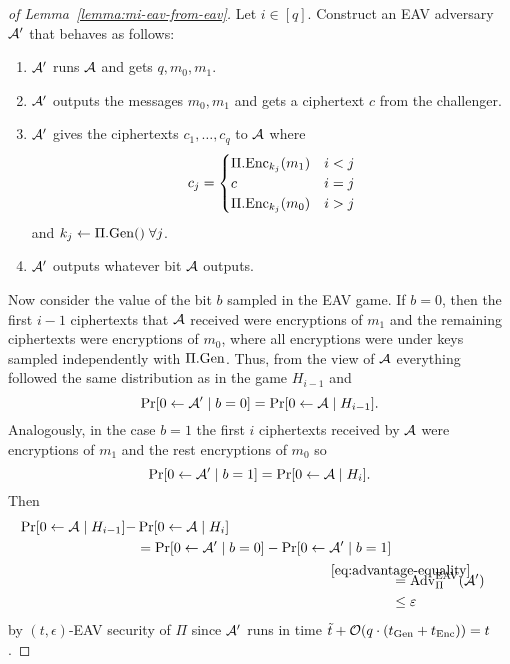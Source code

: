 \begin{proof}[of Lemma~\ref{lemma:mi-eav-from-eav}]
	Let $i \in [q]$. Construct an EAV adversary $\mathcal{A}'$ that behaves as follows:
	\begin{enumerate}[1.]
		\item $\mathcal{A}'$ runs $\mathcal{A}$ and gets $q, m_0, m_1$.
		\item $\mathcal{A}'$ outputs the messages $m_0, m_1$ and gets a ciphertext $c$ from the challenger.
		\item $\mathcal{A}'$ gives the ciphertexts $c_1, \ldots, c_q$ to $\mathcal{A}$ where
		      \[
			      c_j = \begin{cases}
				      \Pi.\mathrm{Enc}_{k_j}(m_1) & i < j \\
				      c                   & i = j \\
				      \Pi.\mathrm{Enc}_{k_j}(m_0) & i > j
			      \end{cases}
		      \]
		      and $k_j \leftarrow \Pi.\mathrm{Gen}() \; \forall j$.
		\item $\mathcal{A}'$ outputs whatever bit $\mathcal{A}$ outputs.
	\end{enumerate}
	Now consider the value of the bit $b$ sampled in the EAV game. If $b = 0$, then the first $i - 1$ ciphertexts that $\mathcal{A}$ received were encryptions of $m_1$ and the remaining ciphertexts were encryptions of $m_0$, where all encryptions were under keys sampled independently with $\Pi.\mathrm{Gen}$. Thus, from the view of $\mathcal{A}$ everything followed the same distribution as in the game $H_{i - 1}$ and
	\[
		\pr{0 \from \adv' \mid b = 0} = \pr{0 \from \adv \mid H_{i - 1}}.
	\]
	Analogously, in the case $b = 1$ the first $i$ ciphertexts received by $\mathcal{A}$ were encryptions of $m_1$ and the rest encryptions of $m_0$ so
	\[
		\pr{0 \from \adv' \mid b = 1} = \pr{0 \from \adv \mid H_{i}}.
	\]
	Then
	\begin{align} \label{eq:eav-to-mi-eav-hybrid-distinguisher}
		\begin{split}
			\begin{split}
				\pr{0 \from \adv \mid H_{i - 1}} - & \pr{0 \from \adv \mid H_{i}} \\
				& = \pr{0 \from \adv' \mid b = 0} - \pr{0 \from \adv' \mid b = 1}
			\end{split} \\
			& \stackrel{\mathclap{\eqref{eq:advantage-equality}}}{=}  \mathrm{Adv}_{\Pi}^{\mathrm{EAV}}(\adv')                                         \\
			& \le \epsilon
		\end{split}
	\end{align}
	by $(t, \epsilon)$-EAV security of $\Pi$ since $\mathcal{A}'$ runs in time $\tilde{t} + \mathcal{O}(q \cdot (t_{\mathrm{Gen}} + t_{\mathrm{Enc}})) = t$.


\end{proof}
